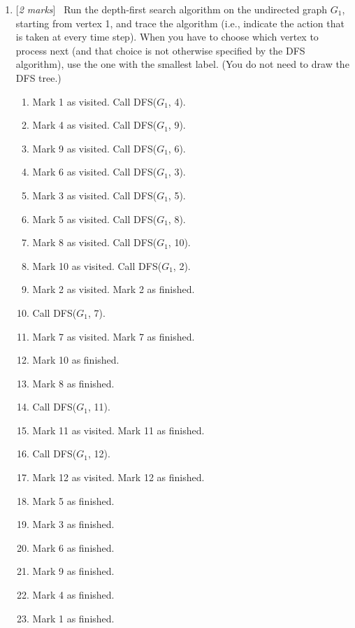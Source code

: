 \documentclass[11pt]{article}
\newcommand{\Q}[1]{\medskip\item {[{\em #1 marks\/}]}\ }
\begin{document}
\begin{enumerate}
\begin{enumerate}
	\newpage
	\Q{2} Run the depth-first search algorithm on the undirected graph $G_1$, starting from vertex 1, and trace the algorithm (i.e., indicate the action that is taken at every time step). When you have to choose which vertex to process next (and that choice is not otherwise specified by the DFS algorithm), use the one with the smallest label. (You do not need to draw the DFS tree.)
	\begin{center}
		\begin{enumerate}[label={\arabic*.}]
			\item Mark 1 as visited. Call DFS($G_1$, 4).
			\item Mark 4 as visited. Call DFS($G_1$, 9).
			\item Mark 9 as visited. Call DFS($G_1$, 6).
			\item Mark 6 as visited. Call DFS($G_1$, 3).
			\item Mark 3 as visited. Call DFS($G_1$, 5).
			\item Mark 5 as visited. Call DFS($G_1$, 8).
			\item Mark 8 as visited. Call DFS($G_1$, 10).
			\item Mark 10 as visited. Call DFS($G_1$, 2).
			\item Mark 2 as visited. Mark 2 as finished.
			\item Call DFS($G_1$, 7).
			\item Mark 7 as visited. Mark 7 as finished.
			\item Mark 10 as finished.
			\item Mark 8 as finished.
			\item Call DFS($G_1$, 11).
			\item Mark 11 as visited. Mark 11 as finished.
			\item Call DFS($G_1$, 12).
			\item Mark 12 as visited. Mark 12 as finished.
			\item Mark 5 as finished.
			\item Mark 3 as finished.
			\item Mark 6 as finished.
			\item Mark 9 as finished.
			\item Mark 4 as finished.
			\item Mark 1 as finished.
		\end{enumerate}
	\end{center}	


\end{enumerate}
\end{enumerate}
\end{document}
